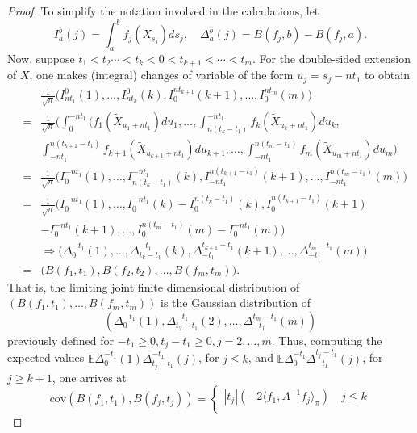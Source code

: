 \documentclass[11pt]{article}
\numberwithin{equation}{section}
\theoremstyle{definition}
\theoremstyle{remark}
\theoremstyle{definition}
\begin{document}
\begin{proof}
To simplify the notation involved in the calculations,
let 
\begin{equation}I_a^b(j) = \int_a^bf_j(X_{s_j})ds_j,\quad 
\Delta_a^b(j) = B(f_j,b)-B(f_j,a).\end{equation}
Now, suppose $t_1<t_2\cdots<t_k<0<t_{k+1}<\cdots < t_m$.
For the double-sided extension of $X$, one makes  (integral) changes
 of variable of the form $u_j = s_j-nt_1$ to obtain 
 \begin{eqnarray}
 &&\frac{1}{\sqrt{n}}\bigg(I_{nt_1}^0(1),\dots,I_{nt_k}^0(k),
 I_{0}^{nt_{k+1}}(k+1),\dots,I_0^{nt_m}(m)\bigg)\nonumber\\
 &=&\frac{1}{\sqrt{n}}\bigg(\int_0^{-nt_1}(f_1(\tilde{X}_{u_1+nt_1})du_1,\dots,\int_{n(t_k-t_1)}^{-nt_1}f_k(\tilde{X}_{u_k+nt_1})du_k,\nonumber\nonumber\\
 &&\int_{-{nt_1}}^{n(t_{k+1}-t_1)}f_{k+1}(\tilde{X}_{u_{k+1}+nt_1})du_{k+1},\dots,\int_{-nt_1}^{n(t_m-t_1)}f_m(\tilde{X}_{u_m+nt_1})du_m\bigg)\nonumber\\
&=&\frac{1}{\sqrt{n}}\bigg(I_0^{-nt_1}(1),\dots,I_{n(t_k-t_1)}^{-nt_1}(k),
 I_{-{nt_1}}^{n(t_{k+1}-t_1)}(k+1),\dots,I_{-nt_1}^{n(t_m-t_1)}(m)\bigg)\nonumber\\
&=&\frac{1}{\sqrt{n}}\bigg(I_0^{-nt_1}(1),\dots,
I_0^{-nt_1}(k)
-I_0^{n(t_k-t_1)}(k),
 I_{0}^{n(t_{k+1}-t_1)}(k+1)\nonumber\\
&&-I_0^{-nt_1}(k+1),\dots,
I_{0}^{n(t_m-t_1)}(m)
-I_{0}^{-nt_1}(m)\bigg)\nonumber\\
&&\Rightarrow \bigg(\Delta_0^{-t_1}(1),\dots,
\Delta^{-t_1}_{t_k-t_1}(k),
\Delta^{t_{k+1}-t_1}_{-t_1}(k+1),\dots,
\Delta^{t_m-t_1}_{-t_1}(m)\bigg)\nonumber\\
&=&\bigg(B(f_1,t_1),B(f_2,t_2),\dots,B(f_m,t_m)\bigg). 
 \end{eqnarray}
 That is, the limiting joint finite dimensional
  distribution of $(B(f_1,t_1),\dots,B(f_m,t_m))$ is the Gaussian distribution of 
  $$(\Delta_0^{-t_1}(1),\Delta^{-t_1}_{t_2-t_1}(2),\dots,
  \Delta^{t_m-t_1}_{-t_1}(m))$$
  previously defined for $-t_1\ge 0, t_j-t_1\ge 0, j=2,\dots,m$. 
Thus, computing the expected values
 $\mathbb{E}\Delta^{-t_1}_0(1)\Delta^{-t_1}_{t_j-t_1}(j)$, for $j\le k$, 
 and  $\mathbb{E}\Delta^{-t_1}_0\Delta^{t_j-t_1}_{-t_1}(j)$,
 for  $j\ge k+1$,
 one arrives at 
  \begin{equation}\label{covform1}
\text{cov}(B(f_1,t_1),B(f_j,t_j))
  =\begin{cases} |t_j|
  (-2\langle f_1, A^{-1}f_j\rangle_\pi)\quad j\le k\\

\end{cases}
\end{equation}
\end{proof}
\end{document}
